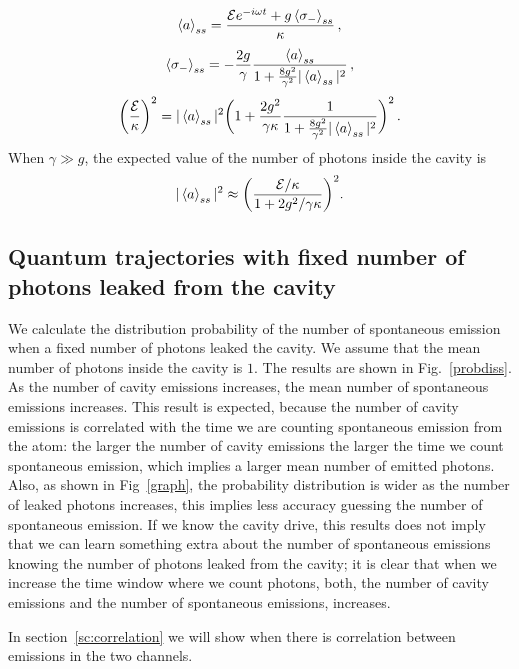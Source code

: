 \documentclass[%
 reprint,
 amsmath,amssymb,
 aps, 
]{revtex4-1}
\begin{document}
\begin{equation} \label{chaf1}
\expval{a}_{ss} = \frac{\mathcal{E}e^{-i\omega t} +
  g\expval{\sigma_-}_{ss}}{\kappa}\, ,
\end{equation}
\begin{equation} \label{chaf2}
\expval{\sigma_-}_{ss} = -\frac{2g}{\gamma}\frac{\expval{a}_{ss}}{1 +
  \frac{8g^2}{\gamma^2}|\expval{a}_{ss}|^2}\, ,
\end{equation}
\begin{equation}
\bigg(\frac{\mathcal{E}}{\kappa}\bigg)^2 = |\expval{a}_{ss}|^2 \bigg(1
+ \frac{2g^2}{\gamma \kappa}\frac{1}{1 +
  \frac{8g^2}{\gamma^2}|\expval{a}_{ss}|^2}\bigg)^2\, .
\end{equation}
When $\gamma \gg g$, the expected value of the number of photons inside
the cavity is 
\begin{equation} \label{numfo}
|\expval{a}_{ss}|^2 \approx \bigg(\frac{\mathcal{E}/\kappa}{1 + 2g^2/\gamma \kappa}\bigg)^2.
\end{equation}


\subsection{Quantum trajectories with fixed number of photons leaked from the cavity}
We calculate the distribution probability of the number of spontaneous
emission when a fixed number of photons leaked the cavity. We assume
that the mean number of photons inside the cavity is $1$. The
results are shown in Fig.~\ref{probdiss}. As the number of cavity
emissions increases, the mean number of spontaneous emissions
increases. This result is expected, because the number of cavity
emissions is correlated with the time we are counting spontaneous
emission from the atom: the larger the number of cavity
emissions the larger the time we count spontaneous emission,
which implies a larger mean number of emitted photons. Also, as shown
in Fig~\ref{graph}, the probability distribution is wider as the
number of leaked photons increases, this implies less accuracy
guessing the number of spontaneous emission. If we know the cavity
drive, this results does not imply that we can learn something extra
about the number of spontaneous emissions knowing the number of
photons leaked from the cavity; it is clear that when we increase the
time window where we count photons, both, the number of cavity emissions
and the number of spontaneous emissions, increases.

In section~\ref{sc:correlation} we will show
when there is correlation between emissions in the two channels.
\end{document}
